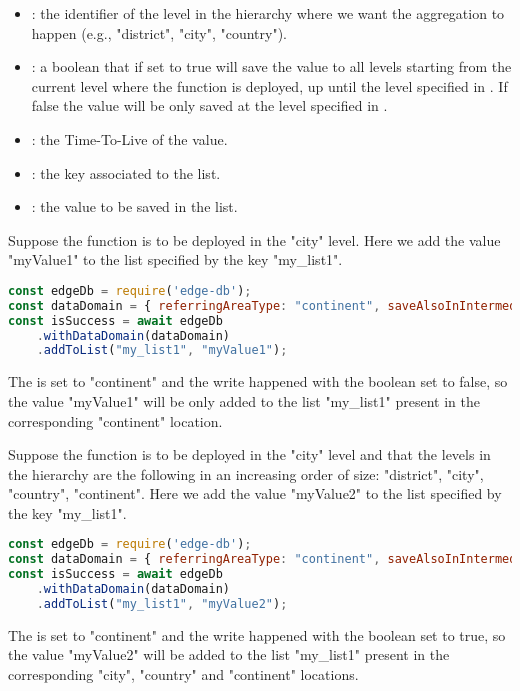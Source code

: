 \begin{itemize}
    \item {}: the identifier of the level in the hierarchy where we want the aggregation to happen (e.g., "district", "city", "country").
    \item {}: a boolean that if set to true will save the value to all levels starting from the current level where the function is deployed, up until the level specified in . If false the value will be only saved at the level specified in .
    \item {}: the Time-To-Live of the value.
    \item {}: the key associated to the list.
    \item {}: the value to be saved in the list.
\end{itemize}

\begin{example}
Suppose the function is to be deployed in the "city" level. Here we add the value "myValue1" to the list specified by the key "my\_list1".
\begin{lstlisting}[language=javascript]
const edgeDb = require('edge-db');
const dataDomain = { referringAreaType: "continent", saveAlsoInIntermediateLevels: false, ttl: 60*60*1000 };
const isSuccess = await edgeDb
    .withDataDomain(dataDomain)
    .addToList("my_list1", "myValue1");
\end{lstlisting}
The  is set to "continent" and the write happened with the  boolean set to false, so the value "myValue1" will be only added to the list "my\_list1" present in the corresponding "continent" location.
\end{example}

\begin{example}
Suppose the function is to be deployed in the "city" level and that the levels in the hierarchy are the following in an increasing order of size: "district", "city", "country", "continent". Here we add the value "myValue2" to the list specified by the key "my\_list1".
\begin{lstlisting}[language=javascript]
const edgeDb = require('edge-db');
const dataDomain = { referringAreaType: "continent", saveAlsoInIntermediateLevels: true, ttl: 60*60*1000 };
const isSuccess = await edgeDb
    .withDataDomain(dataDomain)
    .addToList("my_list1", "myValue2");
\end{lstlisting}
The  is set to "continent" and the write happened with the  boolean set to true, so the value "myValue2" will be added to the list "my\_list1" present in the corresponding "city", "country" and "continent" locations.
\end{example}


